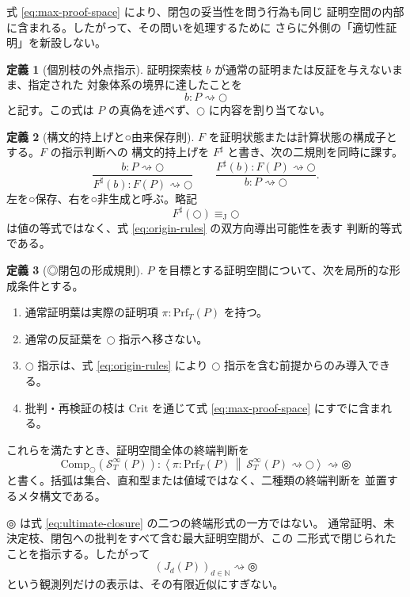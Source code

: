 \documentclass[a4paper,11pt]{ltjsarticle}
\theoremstyle{definition}
\newtheorem{definition}{定義}[section]
\theoremstyle{plain}
\newcommand{\dfix}{\mathord{\text{○}}}
\newcommand{\udfix}{\mathord{\text{◎}}}
\newcommand{\N}{\mathbb{N}}
\newcommand{\Prf}{\mathrm{Prf}}
\newcommand{\Comp}{\mathrm{Comp}_{\dfix}}
\newcommand{\Crit}{\mathrm{Crit}}
\newcommand{\Sinf}{\mathcal{S}^{\infty}}
\newcommand{\JTeq}{\equiv_{\mathrm{J}}}
\newcommand{\1}{\mathbf{1}}
\begin{document}
式 \eqref{eq:max-proof-space} により、閉包の妥当性を問う行為も同じ
証明空間の内部に含まれる。したがって、その問いを処理するために
さらに外側の「適切性証明」を新設しない。

\begin{definition}[個別枝の外点指示]
証明探索枝 $b$ が通常の証明または反証を与えないまま、指定された
対象体系の境界に達したことを
\[
 b:P\rightsquigarrow\dfix
\]
と記す。この式は $P$ の真偽を述べず、$\dfix$ に内容を割り当てない。
\end{definition}

\begin{definition}[構文的持上げと○由来保存則]
$F$ を証明状態または計算状態の構成子とする。$F$ の指示判断への
構文的持上げを $F^\sharp$ と書き、次の二規則を同時に課す。
\begin{equation}\label{eq:origin-rules}
 \frac{b:P\rightsquigarrow\dfix}
      {F^\sharp(b):F(P)\rightsquigarrow\dfix}
 \qquad
 \frac{F^\sharp(b):F(P)\rightsquigarrow\dfix}
      {b:P\rightsquigarrow\dfix}.
\end{equation}
左を○保存、右を○非生成と呼ぶ。略記
\[
 F^\sharp(\dfix)\JTeq\dfix
\]
は値の等式ではなく、式 \eqref{eq:origin-rules} の双方向導出可能性を表す
判断的等式である。
\end{definition}

\begin{definition}[◎閉包の形成規則]
$P$ を目標とする証明空間について、次を局所的な形成条件とする。
\begin{enumerate}
 \item 通常証明葉は実際の証明項 $\pi:\Prf_T(P)$ を持つ。
 \item 通常の反証葉を $\dfix$ 指示へ移さない。
 \item $\dfix$ 指示は、式 \eqref{eq:origin-rules} により
       $\dfix$ 指示を含む前提からのみ導入できる。
 \item 批判・再検証の枝は $\Crit$ を通じて式
       \eqref{eq:max-proof-space} にすでに含まれる。
\end{enumerate}
これらを満たすとき、証明空間全体の終端判断を
\begin{equation}\label{eq:ultimate-closure}
 \Comp(\Sinf_T(P)):
 \left\langle
   \pi:\Prf_T(P)
   \ \middle\Vert\
   \Sinf_T(P)\rightsquigarrow\dfix
 \right\rangle
 \rightsquigarrow\udfix
\end{equation}
と書く。括弧は集合、直和型または値域ではなく、二種類の終端判断を
並置するメタ構文である。
\end{definition}

$\udfix$ は式 \eqref{eq:ultimate-closure} の二つの終端形式の一方ではない。
通常証明、未決定枝、閉包への批判をすべて含む最大証明空間が、この
二形式で閉じられたことを指示する。したがって
\[
 (J_d(P))_{d\in\N}\rightsquigarrow\udfix
\]
という観測列だけの表示は、その有限近似にすぎない。
\end{document}
